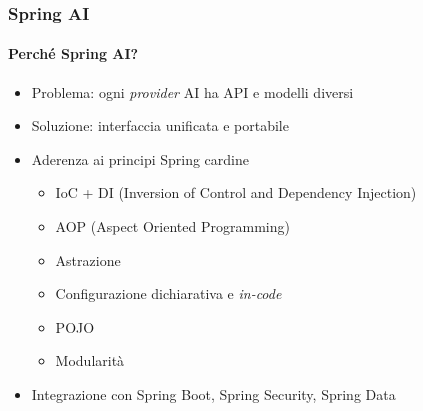 \begin{frame}[t,fragile] \frametitle{Spring AI}
    \framesubtitle{Perché Spring AI?}	
	{\small
	    \begin{minipage}[t]{\textwidth}
	    	\begin{itemize}[leftmargin=10pt,align=right]
				\onslide<2->\item[\alert{\faArrowCircleRight}] \alert{Problema:} ogni \textit{provider} AI ha API e modelli diversi
				\onslide<3->\item[\alert{\faArrowCircleRight}] \alert{Soluzione:} interfaccia unificata e portabile
				\onslide<4->\item[\alert{\faArrowCircleRight}] Aderenza ai principi Spring cardine
				\begin{itemize}[leftmargin=10pt,align=right]
					\onslide<5->\item[\alert{\faArrowCircleRight}] IoC + DI (Inversion of Control and Dependency Injection)
					\onslide<6->\item[\alert{\faArrowCircleRight}] AOP (Aspect Oriented Programming)
					\onslide<7->\item[\alert{\faArrowCircleRight}] Astrazione
					\onslide<8->\item[\alert{\faArrowCircleRight}] Configurazione dichiarativa e \textit{in-code}
					\onslide<9->\item[\alert{\faArrowCircleRight}] POJO
					\onslide<10->\item[\alert{\faArrowCircleRight}] Modularità
				\end{itemize}
				\item[\alert{\faArrowCircleRight}] \alert{Integrazione} con Spring Boot, Spring Security, Spring Data
			\end{itemize}
        \end{minipage}
	}
\end{frame}
%
